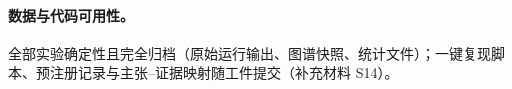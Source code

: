 \documentclass[10pt,a4paper]{ctexart}
\begin{document}
\paragraph{数据与代码可用性。}全部实验确定性且完全归档（原始运行输出、图谱快照、统计文件）；一键复现脚本、预注册记录与主张--证据映射随工件提交（补充材料 S14）。



\end{document}
